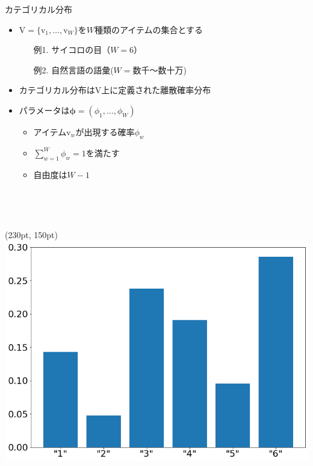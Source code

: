 \documentclass[aspectratio=169,unicode,dvipdfmx,14pt]{beamer}
\begin{document}
\begin{frame}{カテゴリカル分布}
\begin{itemize}
\item $\mbox{V}=\{\mbox{v}_1,\ldots,\mbox{v}_W\}$を$W$種類のアイテムの集合とする
\begin{itemize}
\item[例1.] サイコロの目（$W=6$）
\item[例2.] 自然言語の語彙($W=\mbox{数千〜数十万}$)
\end{itemize}
\item カテゴリカル分布は$\mbox{V}$上に定義された離散確率分布
\item パラメータは$\bm{\phi}=(\phi_1,\ldots,\phi_W)$
\begin{itemize}
\item アイテム$\mbox{v}_w$が出現する確率$\phi_w$
\item $\sum_{w=1}^W \phi_w = 1$を満たす
\item 自由度は$W-1$
\item[] \ 
\item[] \ 
\end{itemize}
\end{itemize}
\begin{textblock*}{0.5\linewidth}(230pt, 150pt)
    \centering
    \includegraphics[width=0.7\linewidth]{dice_bar_chart.png}
\end{textblock*}
\end{frame}
\end{document}

